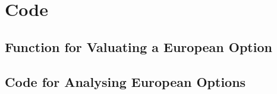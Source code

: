 \documentclass[12pt]{article}
\begin{document}
\section{Code}
  \subsection{Function for Valuating a European Option}
     
  \subsection{Code for Analysing European Options}
     
\end{document}
